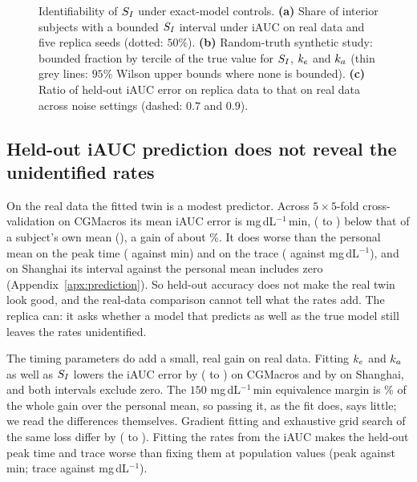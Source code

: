 \begin{figure}[tbp]
\centering
{}
\caption{Identifiability of $S_I$ under exact-model controls. \textbf{(a)} Share of interior subjects with a bounded $S_I$ interval under iAUC on real data and five replica seeds (dotted: $50\%$). \textbf{(b)} Random-truth synthetic study: bounded fraction by tercile of the true value for $S_I$, $k_e$ and $k_a$ (thin grey lines: $95\%$ Wilson upper bounds where none is bounded). \textbf{(c)} Ratio of held-out iAUC error on replica data to that on real data across noise settings (dashed: $0.7$ and $0.9$).}
\label{fig:replica}
\end{figure}

\subsection{Held-out iAUC prediction does not reveal the unidentified rates}
\label{sec:prediction}

On the real data the fitted twin is a modest predictor.
Across $5\times5$-fold cross-validation on CGMacros its mean iAUC error is \resMaeGradThree{} mg\,dL$^{-1}$\,min, \resDiffGradThreeVsPersonalMean{} (\resDiffGradThreeVsPersonalMeanLow{} to \resDiffGradThreeVsPersonalMeanHigh) below that of a subject's own mean (\resMaePersonalMean), a gain of about \resGainPct\%.
It does worse than the personal mean on the peak time (\resPeakGradThree{} against \resPeakPersonalMean{} min) and on the trace (\resTraceRmseGradThree{} against \resTraceRmsePersonalMean{} mg\,dL$^{-1}$), and on Shanghai its interval against the personal mean includes zero (Appendix~\ref{apx:prediction}).
So held-out accuracy does not make the real twin look good, and the real-data comparison cannot tell what the rates add.
The replica can: it asks whether a model that predicts as well as the true model still leaves the rates unidentified.

The timing parameters do add a small, real gain on real data.
Fitting $k_e$ and $k_a$ as well as $S_I$ lowers the iAUC error by \resDiffGradThreeVsGradOne{} (\resDiffGradThreeVsGradOneLow{} to \resDiffGradThreeVsGradOneHigh) on CGMacros and by \resShCvDiffGradThreeVsGradOne{} on Shanghai, and both intervals exclude zero.
The $150$ mg\,dL$^{-1}$\,min equivalence margin is \resMarginShareGain\% of the whole gain over the personal mean, so passing it, as the fit does, says little; we read the differences themselves.
Gradient fitting and exhaustive grid search of the same loss differ by \resDiffGradThreeVsGridThree{} (\resDiffGradThreeVsGridThreeLow{} to \resDiffGradThreeVsGridThreeHigh).
Fitting the rates from the iAUC makes the held-out peak time and trace worse than fixing them at population values (peak \resPeakGradThree{} against \resPeakGradOne{} min; trace \resTraceRmseGradThree{} against \resTraceRmseGradOne{} mg\,dL$^{-1}$).


